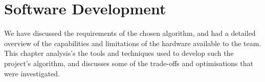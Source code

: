 \chapter{Software Development}

We have discussed the requirements of the chosen algorithm, and had a detailed overview of the capabilities and limitations of the hardware available to the team. This chapter analysis's the tools and techniques used to develop such the project's algorithm, and discusses some of the trade-offs and optimisations that were investigated.





